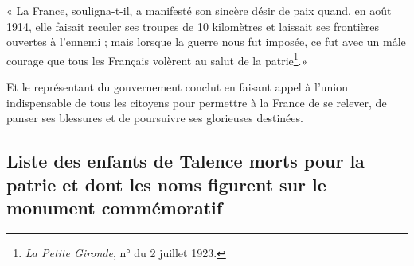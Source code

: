 \documentclass[a4paper,11pt]{book}
\begin{document}
« La France, souligna-t-il, a manifesté son sincère désir de paix quand, en août 1914, elle faisait reculer ses troupes de 10 kilomètres et laissait ses frontières ouvertes à l'ennemi ; mais lorsque la guerre nous fut imposée, ce fut avec un mâle courage que tous les Français volèrent au salut de la patrie\footnote{\textit{La Petite Gironde}, n° du 2 juillet 1923.}.»

Et le représentant du gouvernement conclut en faisant appel à l'union indispensable de tous les citoyens pour permettre à la France de se relever, de panser ses blessures et de poursuivre ses glorieuses destinées.

\subsection{Liste des enfants de Talence morts pour la patrie et dont les noms figurent sur le monument commémoratif}
\end{document}
